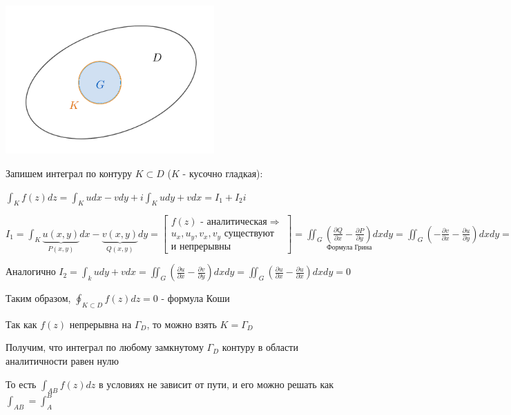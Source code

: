 \begin{MyProof}
    \begin{center}
        \includegraphics[width=8cm]{addchapters2/images/addchapters2_2025_04_04_1}
    \end{center}

    Запишем интеграл по контуру $K \subset D$ ($K$ - кусочно гладкая):

    $\int_K f(z) dz = \int_K u dx - vdy + i \int_K u dy + v dx = I_1 + I_2 i$

    $I_1 = \int_K \underset{P(x, y)}{\underbrace{u(x, y)}} dx - \underset{Q(x, y)}{\underbrace{v(x, y)}} dy = 
    \begin{bmatrix}f(z)\text{ - аналитическая} \Longrightarrow \\ u_x, u_y, v_x, v_y \text{ существуют} \\ \text{и непрерывны}\end{bmatrix} = 
    \underset{\text{Формула Грина}}{\iint_G \left(\frac{\partial Q}{\partial x} - \frac{\partial P}{\partial y}\right) dxdy} = 
    \iint_G \left(-\frac{\partial v}{\partial x} - \frac{\partial u}{\partial y}\right) dxdy = 
    \iint_G \left(\frac{\partial u}{\partial y} - \frac{\partial u}{\partial y}\right) dxdy = 0$

    Аналогично $I_2 = \int_k udy + vdx = \iint_G \left(\frac{\partial u}{\partial x} - \frac{\partial v}{\partial y}\right) dxdy = 
    \iint_G \left(\frac{\partial u}{\partial x} - \frac{\partial u}{\partial x}\right) dxdy = 0$

    Таким образом, $\oint_{K \subset D} f(z) dz = 0$ - формула Коши

    Так как $f(z)$ непрерывна на $\Gamma_D$, то можно взять $K = \Gamma_D$
\end{MyProof}

\Nota Получим, что интеграл по любому замкнутому $\Gamma_D$ контуру в области аналитичности равен нулю

То есть $\int_{AB} f(z) dz$ в условиях  не зависит от пути, и его можно решать как $\int_{AB} = \int_A^B$


